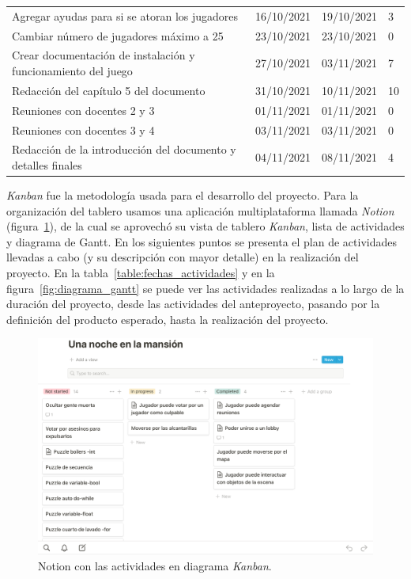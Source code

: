 \begin{longtable}[c]{m{} m{} m{} m{}}
        Agregar ayudas para si se atoran los jugadores & 16/10/2021 & 19/10/2021 & 3 \\  
        Cambiar número de jugadores máximo a 25 & 23/10/2021 & 23/10/2021 & 0 \\  
        Crear documentación de instalación y funcionamiento del juego & 27/10/2021 & 03/11/2021 & 7 \\  
        Redacción del capítulo 5 del documento & 31/10/2021 & 10/11/2021 & 10 \\  
        Reuniones con docentes 2 y 3 & 01/11/2021 & 01/11/2021 & 0 \\  
        Reuniones con docentes 3 y 4 & 03/11/2021 & 03/11/2021 & 0 \\  
        Redacción de la introducción del documento y detalles finales & 04/11/2021 & 08/11/2021 & 4 \\  
\end{longtable}

\textit{Kanban} fue la metodología usada para el desarrollo del proyecto. Para la organización del tablero usamos una aplicación multiplataforma llamada  \textit{Notion} (figura~\ref{fig:notion_proyecto}), de la cual se aprovechó su vista de tablero \textit{Kanban}, lista de actividades y diagrama de Gantt. En los siguientes puntos se presenta el plan de actividades llevadas a cabo (y su descripción con mayor detalle) en la realización del proyecto. En la tabla~\ref{table:fechas_actividades} y en la figura~\ref{fig:diagrama_gantt} se puede ver las actividades realizadas a lo largo de la duración del proyecto, desde las actividades del anteproyecto, pasando por la definición del producto esperado, hasta la realización del proyecto. 

\begin{figure}[h!]
    \centering
    \includegraphics[width=0.8\linewidth]{images/notion.png}
    \caption{Notion con las actividades en diagrama \textit{Kanban}.}
    \label{fig:notion_proyecto}
\end{figure}

